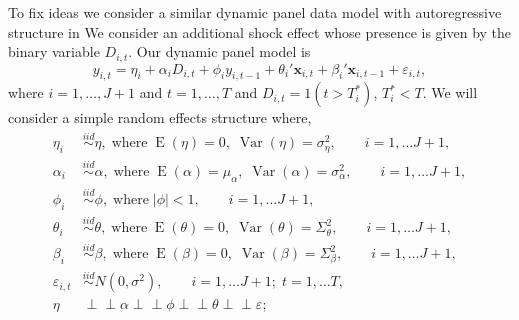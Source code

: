 \documentclass[11pt]{article}
\newcommand{\x}{\textbf{x}}
\newcommand{\indep}{\perp\!\!\!\perp}
\DeclareMathOperator{\E}{E}
\DeclareMathOperator{\Var}{Var}
\begin{document}
To fix ideas we consider a similar dynamic panel data model with autoregressive 
structure in \citet{blundell1998initial} %
We consider an additional shock effect whose presence is given by the binary 
variable $D_{i,t}$.  Our dynamic panel model is  
\begin{equation} \label{DPM}
  y_{i,t} = \eta_i + \alpha_iD_{i,t} + \phi_i y_{i,t-1} + \theta_i' \x_{i,t} + 
    \beta_i' \x_{i,t-1} + \varepsilon_{i,t},  
\end{equation}
where $i = 1,\ldots,J+1$ and $t = 1,\ldots,T$ and $D_{i,t} = 1(t > T_i^*)$, 
$T_i^* < T$.  We will consider a simple random effects structure where,  
\begin{align*}
  \eta_i &\overset{iid}{\sim} \eta,\; \text{where}\; \E(\eta) = 0,\; \Var(\eta) = \sigma_\eta^2, 
    \qquad i = 1,\ldots J+1, \\
  \alpha_i &\overset{iid}{\sim} \alpha,\; \text{where}\; \E(\alpha) = \mu_\alpha,\; 
    \Var(\alpha) = \sigma_\alpha^2, \qquad i = 1,\ldots J+1, \\
  \phi_i &\overset{iid}{\sim} \phi,\; \text{where}\; |\phi| < 1, 
    \qquad i = 1,\ldots J+1, \\
  \theta_i &\overset{iid}{\sim} \theta,\; \text{where}\; \E(\theta) = 0,\; 
    \Var(\theta) = \Sigma_\theta^2, \qquad i = 1,\ldots J+1, \\
  \beta_i &\overset{iid}{\sim} \beta,\; \text{where}\; \E(\beta) = 0,\; 
    \Var(\beta) = \Sigma_\beta^2, \qquad i = 1,\ldots J+1, \\    
  \varepsilon_{i,t} &\overset{iid}{\sim} N(0, \sigma^2), 
    \qquad i = 1,\ldots J+1;\; t = 1, \ldots T, \\
  \eta &\indep \alpha \indep \phi \indep \theta \indep \varepsilon;
\end{align*}
\end{document}
